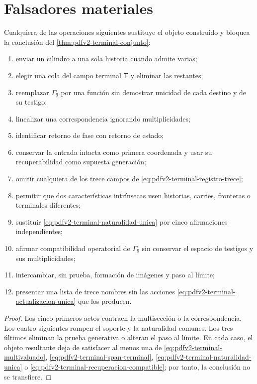 \section{Falsadores materiales}

\begin{proposition}
\label{prop:pdfv2-terminal-falsadores}
Cualquiera de las operaciones siguientes sustituye el objeto construido y
bloquea la conclusi\'on del
\cref{thm:pdfv2-terminal-conjunto}:
\begin{enumerate}
 \item enviar un cilindro a una sola historia cuando admite varias;
 \item elegir una cola del campo terminal \(\mathsf T\) y eliminar las
       restantes;
 \item reemplazar \(\Gamma_9\) por una funci\'on sin demostrar unicidad de
       cada destino y de su testigo;
 \item linealizar una correspondencia ignorando multiplicidades;
 \item identificar retorno de fase con retorno de estado;
 \item conservar la entrada intacta como primera coordenada y usar su
       recuperabilidad como supuesta generaci\'on;
 \item omitir cualquiera de los trece campos de
       \eqref{eq:pdfv2-terminal-registro-trece};
 \item permitir que dos caracter\'isticas intr\'insecas usen historias,
       carries, fronteras o terminales diferentes;
 \item sustituir
       \eqref{eq:pdfv2-terminal-naturalidad-unica} por cinco afirmaciones
       independientes;
 \item afirmar compatibilidad operatorial de \(\Gamma_9\) sin conservar el
       espacio de testigos y sus multiplicidades;
 \item intercambiar, sin prueba, formaci\'on de im\'agenes y paso al l\'imite;
 \item presentar una lista de trece nombres sin las acciones
       \eqref{eq:pdfv2-terminal-actualizacion-unica} que los producen.
\end{enumerate}
\end{proposition}

\begin{proof}
Los cinco primeros actos contraen la multisecci\'on o la correspondencia. Los
cuatro siguientes rompen el soporte y la naturalidad comunes. Los tres
\'ultimos eliminan la prueba generativa o alteran el paso al l\'imite. En
cada caso, el objeto resultante deja de satisfacer al menos una de
\eqref{eq:pdfv2-terminal-multivaluado},
\eqref{eq:pdfv2-terminal-span-terminal},
\eqref{eq:pdfv2-terminal-naturalidad-unica} o
\eqref{eq:pdfv2-terminal-recuperacion-compatible}; por tanto, la conclusi\'on
no se transfiere.
\end{proof}

